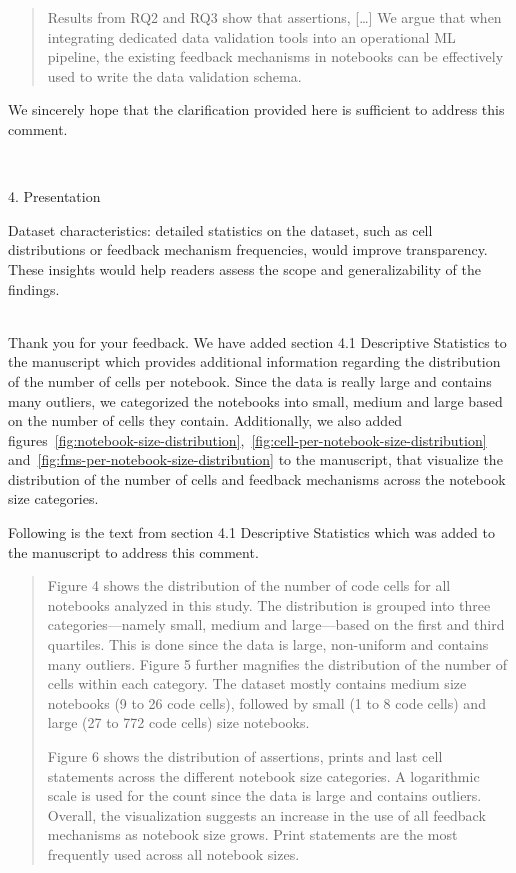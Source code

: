 \documentclass[11pt,fleqn]{article}
\newcommand{\eline}{\vspace*{.75\baselineskip}}
\newcommand{\Referee}[1]{\eline \noindent {\bf Reviewer comment #1:} \\}
\newcommand{\Us}{\eline \noindent {\bf Response:}\\}
\newenvironment{revcomment}[1][]
{\Referee{#1}\begin{rcomment}}
{\end{rcomment}}
\begin{document}
\begin{quote}
  Results from RQ2 and RQ3 show that assertions, [\ldots] We argue that when integrating dedicated data validation tools into an operational ML pipeline, the existing feedback mechanisms in notebooks can be effectively used to write the data validation schema.
\end{quote}

We sincerely hope that the clarification provided here is sufficient to address this comment.

\begin{revcomment}[2.11]
  4. Presentation

  Dataset characteristics: detailed statistics on the dataset, such as cell distributions or feedback mechanism frequencies, would improve transparency. These insights would help readers assess the scope and generalizability of the findings.
\end{revcomment}

\Us Thank you for your feedback. We have added section 4.1 Descriptive Statistics to the manuscript which provides additional information regarding the distribution of the number of cells per notebook. Since the data is really large and contains many outliers, we categorized the notebooks into small, medium and large based on the number of cells they contain. Additionally, we also added figures~\ref{fig:notebook-size-distribution},~\ref{fig:cell-per-notebook-size-distribution} and~\ref{fig:fms-per-notebook-size-distribution} to the manuscript, that visualize the distribution of the number of cells and feedback mechanisms across the notebook size categories.

Following is the text from section 4.1 Descriptive Statistics which was added to the manuscript to address this comment.

\begin{quote}
  Figure 4 shows the distribution of the number of code cells for all notebooks analyzed in this study. The distribution is grouped into three categories---namely small, medium and large---based on the first and third quartiles. This is done since the data is large, non-uniform and contains many outliers. Figure 5 further magnifies the distribution of the number of cells within each category. The dataset mostly contains medium size notebooks (9 to 26 code cells), followed by small (1 to 8 code cells) and large (27 to 772 code cells) size notebooks.

  Figure 6 shows the distribution of assertions, prints and last cell statements across the different notebook size categories. A logarithmic scale is used for the count since the data is large and contains outliers. Overall, the visualization suggests an increase in the use of all feedback mechanisms as notebook size grows. Print statements are the most frequently used across all notebook sizes.
\end{quote}
\end{document}
